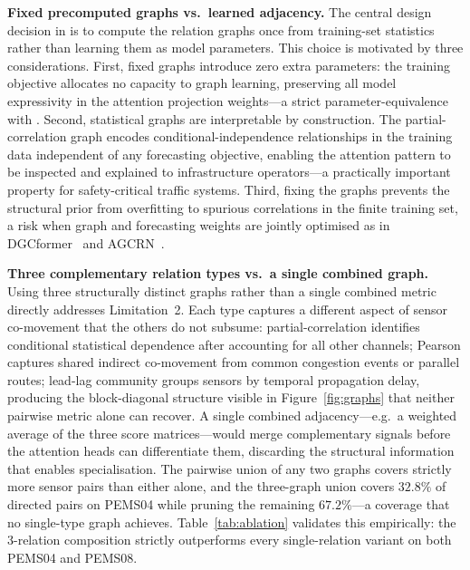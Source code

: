 \textbf{Fixed precomputed graphs vs.\ learned adjacency.}
The central design decision in \mr{} is to compute the relation graphs once from
training-set statistics rather than learning them as model parameters.
This choice is motivated by three considerations.
First, fixed graphs introduce zero extra parameters: the training objective allocates
no capacity to graph learning, preserving all model expressivity in the attention
projection weights---a strict parameter-equivalence with \itrans{}.
Second, statistical graphs are interpretable by construction.
The partial-correlation graph encodes conditional-independence relationships in the
training data independent of any forecasting objective, enabling the attention pattern
to be inspected and explained to infrastructure operators---a practically important
property for safety-critical traffic systems.
Third, fixing the graphs prevents the structural prior from overfitting to spurious
correlations in the finite training set, a risk when graph and forecasting weights
are jointly optimised as in DGCformer~\cite{han2024dgcformer} and
AGCRN~\cite{bai2020adaptive}.

\textbf{Three complementary relation types vs.\ a single combined graph.}
Using three structurally distinct graphs rather than a single combined metric directly
addresses Limitation~2.
Each type captures a different aspect of sensor co-movement that the others do not
subsume: partial-correlation identifies conditional statistical dependence after accounting for
all other channels; Pearson captures shared indirect co-movement from common
congestion events or parallel routes; lead-lag community groups sensors by
temporal propagation delay, producing the block-diagonal structure visible
in Figure~\ref{fig:graphs} that neither pairwise metric alone can recover.
A single combined adjacency---e.g.\ a weighted average of the three score
matrices---would merge complementary signals before the attention heads can
differentiate them, discarding the structural information that enables specialisation.
The pairwise union of any two graphs covers strictly more sensor pairs than either
alone, and the three-graph union covers $32.8\%$ of directed pairs on PEMS04
while pruning the remaining $67.2\%$---a coverage that no single-type graph achieves.
Table~\ref{tab:ablation} validates this empirically: the 3-relation composition
strictly outperforms every single-relation variant on both PEMS04 and PEMS08.

